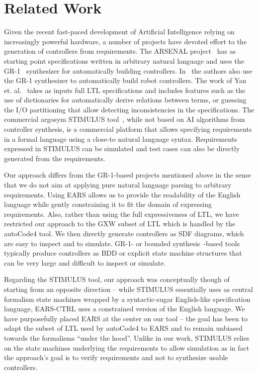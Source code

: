\section{Related Work}
\vspace{-.2cm}Given the recent fast-paced development of Artificial Intelligence
relying on increasingly powerful hardware, a number of projects have devoted
effort to the generation of controllers from requirements. The ARSENAL
project~\cite{ghosh2016arsenal} has as starting point specifications written in
arbitrary natural language and uses the GR-1~\cite{piterman2006synthesis}
synthesizer for automatically building controllers. In~\cite{kress2008translating} the
authors also use the GR-1 synthesizer to automatically build robot
controllers. The work of Yan et. al.~\cite{YanCC15} takes as inputs full LTL
specifications and includes features such as the use of dictionaries for
automatically derive relations between terms, or guessing the I/O partitioning
that allow detecting inconsistencies in the specifications. The commercial
argosym STIMULUS tool~\cite{jeannet16}, while not based on AI algorithms from controller
synthesis, is a commercial platform that allows specifying requirements in a 
formal language using a close-to natural language syntax. Requirements expressed
in STIMULUS can be simulated and test cases can also be directly generated from
the requirements.

Our approach differs from the GR-1-based projects mentioned above in the sense
that we do not aim at applying pure natural language parsing to arbitrary
requirements. Using EARS allows us to provide the readability of the English
language while gently constraining it to fit the domain of expressing
requirements. Also, rather than using the full expressiveness of LTL, we have
restricted our approach to the \textsf{GXW} subset of LTL which is handled by
the \textsf{autoCode4} tool. We then directly generate controllers as SDF
diagrams, which are easy to inspect and to simulate. GR-1- or bounded
synthesis~\cite{schewe2007bounded}-based tools typically produce controllers as
BDD or explicit state machine structures that can be very large and difficult to inspect or simulate.

Regarding the STIMULUS tool, our approach was conceptually though of starting
from an opposite direction -- while STIMULUS essentially uses as central
formalism state machines wrapped by a syntactic-sugar English-like specification
language, \textsf{EARS-CTRL} uses a constrained version of the English language.
We have purposefully placed EARS at the center on our tool -- the goal has been
to adapt the subset of LTL used by \textsf{autoCode4} to EARS and to remain
unbiased towards the formalisms ``under the hood''. Unlike in our work, STIMULUS
relies on the state machines underlying the requirements to allow simulation as
in fact the approach's goal is to verify requirements and not to synthesize
usable controllers.\vspace{-.6cm}

